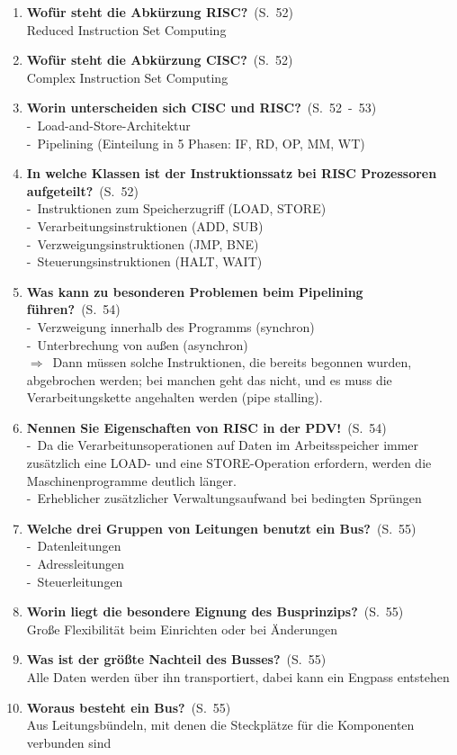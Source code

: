 \documentclass[a4paper,12pt]{article}
\newcommand{\question}[3]{\pagebreak[3]\item {\textbf{#1?}}\ (S.\ #2)#3}
\newcommand{\statement}[3]{\pagebreak[3]\item {\textbf{#1!}}\ (S.\ #2)#3}
\newcommand{\catchword}[1]{\\-\ #1}
\newcommand{\normaltext}[1]{\\#1}
\newcommand{\result}[1]{\\$\Rightarrow$\ #1}
\newcommand{\page}[1]{#1}
\newcommand{\pages}[2]{#1\ -\ #2}
\begin{document}
\begin{enumerate}
  \question{Wofür steht die Abkürzung RISC}{\page{52}}
  {
    \normaltext{Reduced Instruction Set Computing}
  }

  \question{Wofür steht die Abkürzung CISC}{\page{52}}
  {
    \normaltext{Complex Instruction Set Computing}
  }

  \question{Worin unterscheiden sich CISC und RISC}{\pages{52}{53}}
  {
    \catchword{Load-and-Store-Architektur}
    \catchword{Pipelining (Einteilung in 5 Phasen: IF, RD, OP, MM, WT)}
  }

  \question{In welche Klassen ist der Instruktionssatz bei RISC Prozessoren aufgeteilt}{\page{52}}
  {
    \catchword{Instruktionen zum Speicherzugriff (LOAD, STORE)}
    \catchword{Verarbeitungsinstruktionen (ADD, SUB)}
    \catchword{Verzweigungsinstruktionen (JMP, BNE)}
    \catchword{Steuerungsinstruktionen (HALT, WAIT)}
  }

  \question{Was kann zu besonderen Problemen beim Pipelining führen}{\page{54}}
  {
    \catchword{Verzweigung innerhalb des Programms (synchron)}
    \catchword{Unterbrechung von außen (asynchron)}
    \result{Dann müssen solche Instruktionen, die bereits begonnen wurden, abgebrochen 
            werden; bei manchen geht das nicht, und es muss die Verarbeitungskette angehalten 
            werden (pipe stalling).}
  }

  \statement{Nennen Sie Eigenschaften von RISC in der PDV}{\page{54}}
  {
    \catchword{Da die Verarbeitunsoperationen auf Daten im Arbeitsspeicher immer zusätzlich
               eine LOAD- und eine STORE-Operation erfordern, werden die Maschinenprogramme
               deutlich länger.}
    \catchword{Erheblicher zusätzlicher Verwaltungsaufwand bei bedingten Sprüngen}
  }

  \question{Welche drei Gruppen von Leitungen benutzt ein Bus}{\page{55}}
  {
    \catchword{Datenleitungen}
    \catchword{Adressleitungen}
    \catchword{Steuerleitungen}
  }

  \question{Worin liegt die besondere Eignung des Busprinzips}{\page{55}}
  {
    \normaltext{Große Flexibilität beim Einrichten oder bei Änderungen}
  }

  \question{Was ist der größte Nachteil des Busses}{\page{55}}
  {
    \normaltext{Alle Daten werden über ihn transportiert, dabei kann ein Engpass entstehen}
  }

  \question{Woraus besteht ein Bus}{\page{55}}
  {
    \normaltext{Aus Leitungsbündeln, mit denen die Steckplätze für die Komponenten verbunden sind}
  }


\end{enumerate}
\end{document}
